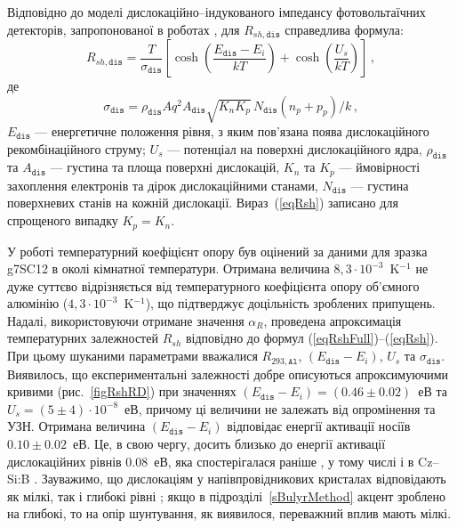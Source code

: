 Відповідно до моделі дислокаційно--індукованого імпедансу фотовольтаїчних детекторів,
запропонованої в роботах \cite{Rsh:Gopal2003,Rsh:Gopal2004},
для $R_{sh,\mathtt{dis}}$ справедлива формула:
\begin{equation}
\label{eqRsh}
R_{sh,\mathtt{dis}}=\frac{T}{\sigma_{\mathtt{dis}}}\left[\cosh\left(\frac{E_\mathtt{dis}-E_i}{kT}\right)+\cosh\left(\frac{U_s}{kT}\right)\right]\,,
\end{equation}
де
\begin{equation}
\label{eqRdis}
\sigma_{\mathtt{dis}}=\rho_{\mathtt{dis}}Aq^2A_{\mathtt{dis}}\sqrt{K_nK_p}\,N_{\mathtt{dis}}(n_p+p_p)/k\,,
\end{equation}
$E_{\mathtt{dis}}$ --- енергетичне положення рівня, з яким пов'язана поява
дислокаційного рекомбінаційного струму;
$U_s$ --- потенціал на поверхні дислокаційного ядра,
$\rho_{\mathtt{dis}}$ та $A_{\mathtt{dis}}$ --- густина та площа поверхні дислокацій,
$K_n$ та $K_p$ --- ймовірності захоплення електронів та дірок дислокаційними станами,
$N_{\mathtt{dis}}$ --- густина поверхневих станів на кожній дислокації.
Вираз~(\ref{eqRsh}) записано для спрощеного випадку $K_p=K_n$.

У роботі температурний коефіцієнт опору був оцінений за даними для зразка g7SC12 в околі кімнатної температури.
Отримана величина $8,3\cdot10^{-3}$~K$^{-1}$ не дуже суттєво відрізняється від температурного
коефіцієнта опору об'ємного алюмінію ($4,3\cdot10^{-3}$~K$^{-1}$),
що підтверджує доцільність зроблених припущень.
Надалі, використовуючи отримане значення $\alpha_R$,
проведена апроксимація температурних залежностей $R_{sh}$ відповідно до формул (\ref{eqRshFull})--(\ref{eqRsh}).
При цьому шуканими параметрами вважалися $R_{293,\mathtt{Al}}$, $(E_{\mathtt{dis}}-E_i)$, $U_s$ та $\sigma_{\mathtt{dis}}$.
Виявилось, що експериментальні залежності добре описуються апроксимуючими кривими (рис.~\ref{figRshRD})
при значеннях $(E_{\mathtt{dis}}-E_i)=(0.46\pm0.02)$~еВ та $U_s=(5\pm4)\cdot10^{-8}$~еВ,
причому ці величини не залежать від опромінення та УЗН.
Отримана величина $(E_{\mathtt{dis}}-E_i)$ відповідає енергії активації носіїв $0.10\pm0.02$~еВ.
Це, в свою чергу, досить близько до енергії активації дислокаційних рівнів $0.08$~еВ,
яка спостерігалася раніше \cite{disl10:Castaldini,disl10:Isakova,disl10:Yur,disl10:Kveder,disl10:Trushin,Si:disl},
у тому числі і в Cz--Si:B \cite{disl10:Castaldini,disl10:Isakova,disl10:Yu}.
Зауважимо, що дислокаціям у напівпровідникових кристалах відповідають як мілкі,
так і глибокі рівні \cite{Disl:GaN};
якщо в підрозділі~\ref{sBulyrMethod} акцент зроблено на глибокі, то на  опір шунтування, як виявилося,
переважний вплив мають мілкі.


